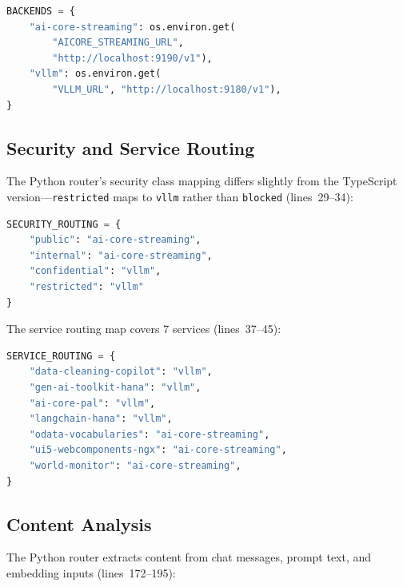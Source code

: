 \documentclass[11pt]{article}
\begin{document}
\begin{lstlisting}[language=Python,caption={BACKENDS config (router.py, lines 23--26)},firstnumber=23]
BACKENDS = {
    "ai-core-streaming": os.environ.get(
        "AICORE_STREAMING_URL",
        "http://localhost:9190/v1"),
    "vllm": os.environ.get(
        "VLLM_URL", "http://localhost:9180/v1"),
}
\end{lstlisting}

\subsection{Security and Service Routing}

The Python router's security class mapping differs slightly from the TypeScript
version---\texttt{restricted} maps to \texttt{vllm} rather than \texttt{blocked}
(lines~29--34):

\begin{lstlisting}[language=Python,caption={SECURITY\_ROUTING (router.py, lines 29--34)},firstnumber=29]
SECURITY_ROUTING = {
    "public": "ai-core-streaming",
    "internal": "ai-core-streaming",
    "confidential": "vllm",
    "restricted": "vllm"
}
\end{lstlisting}

The service routing map covers 7 services (lines~37--45):

\begin{lstlisting}[language=Python,caption={SERVICE\_ROUTING (router.py, lines 37--45)},firstnumber=37]
SERVICE_ROUTING = {
    "data-cleaning-copilot": "vllm",
    "gen-ai-toolkit-hana": "vllm",
    "ai-core-pal": "vllm",
    "langchain-hana": "vllm",
    "odata-vocabularies": "ai-core-streaming",
    "ui5-webcomponents-ngx": "ai-core-streaming",
    "world-monitor": "ai-core-streaming",
}
\end{lstlisting}

\subsection{Content Analysis}

The Python router extracts content from chat messages, prompt text, and
embedding inputs (lines~172--195):
\end{document}
